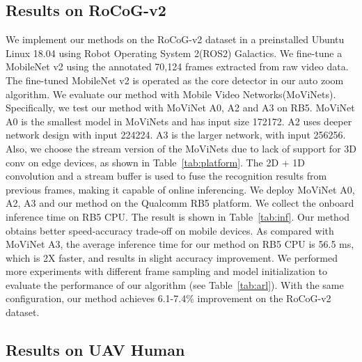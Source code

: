 \documentclass[letterpaper, 10 pt, conference]{ieeeconf}
\begin{document}
\subsection{Results on RoCoG-v2}

We implement our methods on the RoCoG-v2 dataset in a preinstalled Ubuntu Linux 18.04 using Robot Operating System 2(ROS2) Galactics. We fine-tune a MobileNet v2\cite{sandler2018mobilenetv2} using the annotated 70,124 frames extracted from raw video data. The fine-tuned MobileNet v2\cite{sandler2018mobilenetv2} is operated as the core detector in our auto zoom algorithm. We evaluate our method with Mobile Video Networks(MoViNets)\cite{kondratyuk2021movinets}. Specifically, we test our method with MoViNet A0, A2 and A3 on RB5. MoViNet A0 is the smallest model in MoViNets and has input size 172172. A2 uses deeper network design with input 224224. A3 is the larger network, with input 256256. Also, we choose the stream version of the MoViNets due to lack of support for 3D conv on edge devices, as shown in Table~\ref{tab:platform}. The 2D + 1D convolution and a stream buffer is used to fuse the recognition results from previous frames, making it capable of online inferencing. We deploy MoViNet A0, A2, A3 and our method on the Qualcomm RB5 platform. We collect the onboard inference time on RB5 CPU. The result is shown in Table~\ref{tab:inf}. Our method obtains better speed-accuracy trade-off on mobile devices. As compared with MoViNet A3, the average inference time for our method on RB5 CPU is 56.5 ms, which is 2X faster, and results in slight accuracy improvement. We performed more experiments with different frame sampling and model initialization to evaluate the performance of our algorithm (see Table~\ref{tab:arl}). With the same configuration, our method achieves 6.1-7.4\% improvement on the RoCoG-v2 dataset.

\subsection{Results on UAV Human}
\end{document}
